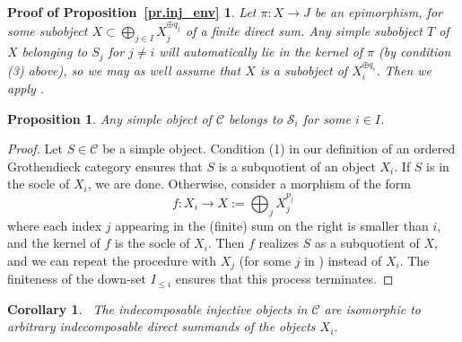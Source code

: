 \documentclass[11pt]{article}
\theoremstyle{plain}
\newtheorem{proposition}[lemma]{Proposition}
\newtheorem{corollary}[lemma]{Corollary}
\theoremstyle{nonumberplain}
\theoremstyle{plain}
\theoremstyle{nonumberplain}
\newtheorem{proof}{Proof}
\newtheorem{proof_of_inj_env}{Proof of Proposition~\ref{pr.inj_env}}
\newcommand\cC{{\mathcal C}}
\begin{document}
\begin{proof_of_inj_env}
Let $\pi: X\to J$ be an epimorphism, for some subobject $\displaystyle X\subset\bigoplus_{j\in I} X_j^{\oplus q_j}$ of a finite direct sum. Any simple subobject $T$ of $X$ belonging to $S_j$ for $j\ne i$ will automatically lie in the kernel of $\pi$ (by condition (3) above), so we may as well assume that $X$ is a subobject of $X_i^{\oplus q_i}$. Then we apply .
\end{proof_of_inj_env}


\begin{proposition}\label{prop.simpleobjinC}
	Any simple object of $\mathcal{C}$ belongs to $\mathcal{S}_i$ for some $i\in I$.
\end{proposition}
\begin{proof}
Let $S\in \cC$ be a simple object. Condition (1) in our definition of an ordered Grothendieck category
ensures that $S$ is a subquotient of an object $X_i$. If $S$ is in
the socle of $X_i$, we are done. Otherwise, consider a morphism of the form 
\begin{equation}\label{eq:Xj}
  f:X_i\to X:=\bigoplus_j X_j^{p_j}
\end{equation}
where each index $j$ appearing in the (finite) sum on the right is
smaller than $i$, and the kernel of $f$ is the socle of $X_i$. Then $f$ realizes $S$ as a subquotient of $X$, and we can repeat the
procedure with $X_j$ (for some $j$ in ) instead of
$X_i$. The finiteness of the down-set $I_{\le i}$ ensures that this
process terminates. 
\end{proof}

\begin{corollary}~\label{cor.indinjobj}
	The indecomposable injective objects in $\mathcal{C}$ are isomorphic to arbitrary indecomposable direct summands of the objects $X_i$.
\end{corollary}













%
\end{document}

